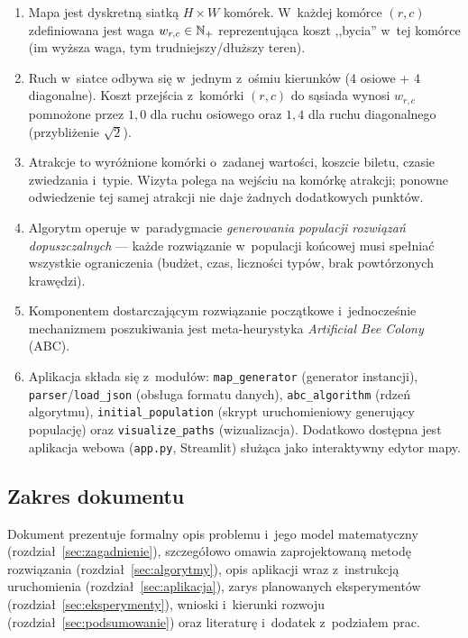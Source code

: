\begin{enumerate}
    \item Mapa jest dyskretną siatką $H \times W$ komórek. W~każdej komórce
          $(r,c)$ zdefiniowana jest waga $w_{r,c} \in \mathbb{N}_{+}$ reprezentująca koszt
          ,,bycia'' w~tej komórce (im wyższa waga, tym trudniejszy/dłuższy teren).
    \item Ruch w~siatce odbywa się w~jednym z~ośmiu kierunków
          (4 osiowe + 4 diagonalne). Koszt przejścia z~komórki $(r,c)$ do sąsiada
          wynosi $w_{r,c}$ pomnożone przez $1{,}0$ dla ruchu osiowego oraz $1{,}4$
          dla ruchu diagonalnego (przybliżenie $\sqrt{2}$).
    \item Atrakcje to wyróżnione komórki o~zadanej wartości, koszcie biletu, czasie
          zwiedzania i~typie. Wizyta polega na wejściu na komórkę atrakcji; ponowne
          odwiedzenie tej samej atrakcji nie daje żadnych dodatkowych punktów.
    \item Algorytm operuje w~paradygmacie \emph{generowania populacji rozwiązań
          dopuszczalnych} --- każde rozwiązanie w~populacji końcowej musi spełniać
          wszystkie ograniczenia (budżet, czas, liczności typów, brak powtórzonych
          krawędzi).
    \item Komponentem dostarczającym rozwiązanie początkowe i~jednocześnie
          mechanizmem poszukiwania jest meta-heurystyka \emph{Artificial Bee Colony}
          (ABC).
    \item Aplikacja składa się z~modułów: \texttt{map\_generator} (generator instancji),
          \texttt{parser}/\texttt{load\_json} (obsługa formatu danych),
          \texttt{abc\_algorithm} (rdzeń algorytmu), \texttt{initial\_population}
          (skrypt uruchomieniowy generujący populację) oraz \texttt{visualize\_paths}
          (wizualizacja). Dodatkowo dostępna jest aplikacja webowa
          (\texttt{app.py}, Streamlit) służąca jako interaktywny edytor mapy.
\end{enumerate}

\subsection*{Zakres dokumentu}

Dokument prezentuje formalny opis problemu i~jego model matematyczny
(rozdział~\ref{sec:zagadnienie}), szczegółowo omawia zaprojektowaną metodę
rozwiązania (rozdział~\ref{sec:algorytmy}), opis aplikacji wraz z~instrukcją
uruchomienia (rozdział~\ref{sec:aplikacja}), zarys planowanych eksperymentów
(rozdział~\ref{sec:eksperymenty}), wnioski i~kierunki rozwoju
(rozdział~\ref{sec:podsumowanie}) oraz literaturę i~dodatek z~podziałem prac.
